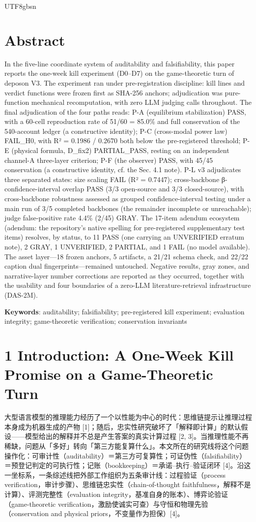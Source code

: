 \documentclass[10pt,a4paper]{article}
\begin{document}
\begin{CJK}{UTF8}{gbsn}
\section*{Abstract}In the five-line coordinate system of auditability and falsifiability, this paper reports the one-week kill experiment (D0–D7) on the game-theoretic turn of deposon V3. The experiment ran under pre-registration discipline: kill lines and verdict functions were frozen first as SHA-256 anchors; adjudication was pure-function mechanical recomputation, with zero LLM judging calls throughout. The final adjudication of the four paths reads: P-A (equilibrium stabilization) PASS, with a 60-cell reproduction rate of 51/60 = 85.0\% and full conservation of the 540-account ledger (a constructive identity); P-C (cross-modal power law) FAIL\_H0, with R² = 0.1986 / 0.2670 both below the pre-registered threshold; P-E (physical formula, D\_fix2) PARTIAL\_PASS, resting on an independent channel-A three-layer criterion; P-F (the observer) PASS, with 45/45 conservation (a constructive identity, cf. the Sec. 4.1 note). P-L v3 adjudicates three separated states: size scaling FAIL (R² = 0.7447); cross-backbone β-confidence-interval overlap PASS (3/3 open-source and 3/3 closed-source), with cross-backbone robustness assessed as grouped confidence-interval testing under a main run of 3/5 completed backbones (the remainder incomplete or unreachable); judge false-positive rate 4.4\% (2/45) GRAY. The 17-item adendum ecosystem (adendum: the repository's native spelling for pre-registered supplementary test items) resolves, by status, to 11 PASS (one carrying an UNVERIFIED erratum note), 2 GRAY, 1 UNVERIFIED, 2 PARTIAL, and 1 FAIL (no model available). The asset layer—18 frozen anchors, 5 artifacts, a 21/21 schema check, and 22/22 caption dual fingerprints—remained untouched. Negative results, gray zones, and narrative-layer number corrections are reported as they occurred, together with the usability and four boundaries of a zero-LLM literature-retrieval infrastructure (DAS-2M).

\noindent \textbf{Keywords}: auditability; falsifiability; pre-registered kill experiment; evaluation integrity; game-theoretic verification; conservation invariants


\section*{1 Introduction: A One-Week Kill Promise on a Game-Theoretic Turn}大型语言模型的推理能力经历了一个以性能为中心的时代：思维链提示让推理过程本身成为机器生成的产物 [1]；随后，忠实性研究破坏了「解释即计算」的默认假设——模型给出的解释并不总是产生答案的真实计算过程 [2, 3]。当推理性能不再稀缺，问题从「多好」转向「第三方能复算什么」。本文所在的研究线将这个问题操作化：可审计性（auditability）＝第三方可复算性；可证伪性（falsifiability）＝预登记判定的可执行性；记账（bookkeeping）＝承诺–执行–验证闭环 [4]。沿这一坐标系，一条综述线把外部工作组织为五条审计线：过程验证（process verification，审计步骤）、思维链忠实性（chain-of-thought faithfulness，解释不是计算）、评测完整性（evaluation integrity，基准自身的账本）、博弈论验证（game-theoretic verification，激励使诚实可查）与守恒和物理先验（conservation and physical priors，不变量作为担保）[4]。


\end{CJK}
\end{document}
